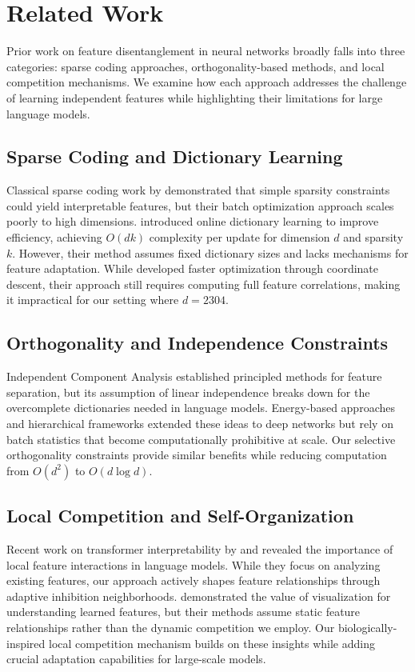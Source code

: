 \documentclass{article} %
\begin{document}
\section{Related Work}
\label{sec:related}
Prior work on feature disentanglement in neural networks broadly falls into three categories: sparse coding approaches, orthogonality-based methods, and local competition mechanisms. We examine how each approach addresses the challenge of learning independent features while highlighting their limitations for large language models.

\subsection{Sparse Coding and Dictionary Learning}
Classical sparse coding work by \cite{Olshausen1996EmergenceOS} demonstrated that simple sparsity constraints could yield interpretable features, but their batch optimization approach scales poorly to high dimensions. \cite{Mairal2009OnlineLF} introduced online dictionary learning to improve efficiency, achieving $O(dk)$ complexity per update for dimension $d$ and sparsity $k$. However, their method assumes fixed dictionary sizes and lacks mechanisms for feature adaptation. While \cite{Lee2006EfficientSC} developed faster optimization through coordinate descent, their approach still requires computing full feature correlations, making it impractical for our setting where $d=2304$.

\subsection{Orthogonality and Independence Constraints}
Independent Component Analysis \cite{Bell1995AnIA} established principled methods for feature separation, but its assumption of linear independence breaks down for the overcomplete dictionaries needed in language models. Energy-based approaches \cite{Ranzato2006EfficientLO} and hierarchical frameworks \cite{Bengio2007LearningDA} extended these ideas to deep networks but rely on batch statistics that become computationally prohibitive at scale. Our selective orthogonality constraints provide similar benefits while reducing computation from $O(d^2)$ to $O(d\log d)$.

\subsection{Local Competition and Self-Organization}
Recent work on transformer interpretability by \cite{Merullo2024TalkingHU} and \cite{Mondorf2024CircuitCE} revealed the importance of local feature interactions in language models. While they focus on analyzing existing features, our approach actively shapes feature relationships through adaptive inhibition neighborhoods. \cite{Yosinski2015UnderstandingNN} demonstrated the value of visualization for understanding learned features, but their methods assume static feature relationships rather than the dynamic competition we employ. Our biologically-inspired local competition mechanism builds on these insights while adding crucial adaptation capabilities for large-scale models.
\end{document}
